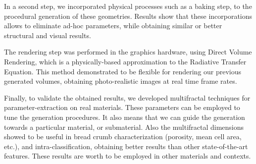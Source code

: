 \documentclass[spanish,a4paper,oneside,10pt,openright]{book}
\begin{document}
In a second step, we incorporated physical processes such as a baking step, to the procedural generation of these geometries.
Results show that these incorporations allows to eliminate ad-hoc parameters, while obtaining similar or better structural and visual results.

The rendering step was performed in the graphics hardware, using Direct Volume Rendering, which is a physically-based approximation to the Radiative Transfer Equation.
This method demonstrated to be flexible for rendering our previous generated volumes, obtaining photo-realistic images at real time frame rates.

Finally, to validate the obtained results, we developed multifractal techniques for parameter-extraction on real materials.
These parameters can be employed to tune the generation procedures.
It also means that we can guide the generation towards a particular material, or submaterial.
Also the multifractal dimensions showed to be useful in bread crumb characterization (porosity, mean cell area, etc.), and intra-classification, obtaining better results than other state-of-the-art features.
These results are worth to be employed in other materials and contexts.

\phantom{p. 1}
\clearpage
\thispagestyle{empty}

\printglossary[type=\acronymtype,style=long3col, title=Acrónimos]

\tableofcontents %

\phantom{p. 1}
\clearpage
\thispagestyle{empty}
\phantom{p. 2}
\clearpage

\cleardoublepage
{} %
\listoffigures %

\phantom{p. 1}
\clearpage
\thispagestyle{empty}
\phantom{p. 1}
\clearpage


\cleardoublepage
{} %
\listoftables %



\newpage


\phantom{p. 1}
\clearpage

 \cleardoublepage

\phantom{p. 1}
\clearpage

 \cleardoublepage


 \cleardoublepage

 \cleardoublepage

 \cleardoublepage

\phantom{p. 1}
\clearpage

 \cleardoublepage

\appendix
 \cleardoublepage



\phantom{p. 1}
\clearpage
\cleardoublepage
{}


\end{document}
